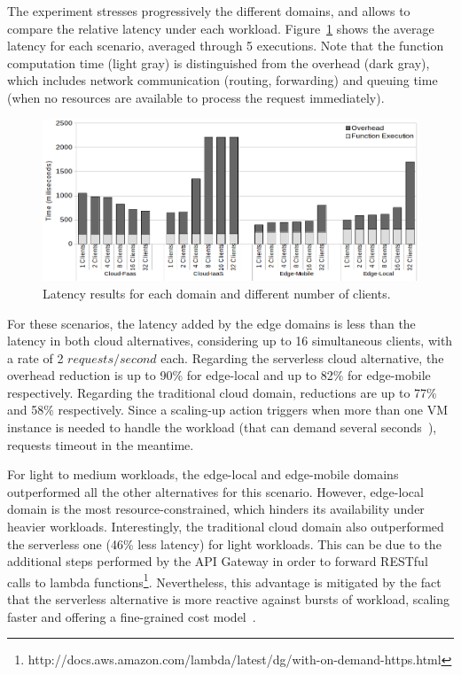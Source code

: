 The experiment stresses progressively the different domains, and allows to compare the relative latency under each workload. Figure~\ref{fig:latency-domains} shows the average latency for each scenario, averaged through 5 executions. Note that the function computation time (light gray) is distinguished from the overhead (dark gray), which includes network communication (routing, forwarding) and queuing time (when no resources are available to process the request immediately). 

\begin{figure}
	
	\centering
	\includegraphics[width=1\textwidth]{figs/latency-domains}
	\caption{Latency results for each domain and different number of clients.}
	\label{fig:latency-domains}
\end{figure}

 For these scenarios, the latency added by the edge domains is less than the latency in both cloud alternatives, considering up to 16 simultaneous clients, with a rate of 2 $requests/second$ each. Regarding the serverless cloud alternative, the overhead reduction is up to 90\% for edge-local and up to 82\% for edge-mobile respectively. Regarding the traditional cloud domain, reductions are up to 77\% and 58\% respectively. Since a scaling-up action triggers when more than one VM instance is needed to handle the workload (that can demand several seconds~\cite{Quatrocchi2016discrete}), requests timeout in the meantime. 
 
 For light to medium workloads, the edge-local and edge-mobile domains outperformed all the other alternatives for this scenario. However, edge-local domain is the most resource-constrained, which hinders its availability under heavier workloads. Interestingly, the traditional cloud domain also outperformed the serverless one (46\% less latency) for light workloads. This can be due to the additional steps performed by the API Gateway in order to forward RESTful calls to lambda functions\footnote{http://docs.aws.amazon.com/lambda/latest/dg/with-on-demand-https.html}. Nevertheless, this advantage is mitigated by the fact that the serverless alternative is more reactive against bursts of workload, scaling faster and offering a fine-grained cost model~\cite{Villamizar2017lambda,Hendrickson:2016}.


